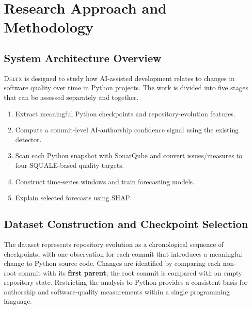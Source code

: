 \documentclass[12pt,a4paper,oneside]{report}
\newcommand{\systemname}{\textsc{Deltx}}
\begin{document}
\chapter{Research Approach and Methodology}
\label{ch:methodology}

\section{System Architecture Overview}
\systemname{} is designed to study how AI-assisted development relates to changes in software quality over time in Python projects. The work is divided into five stages that can be assessed separately and together.

\begin{enumerate}[leftmargin=*]
    \item Extract meaningful Python checkpoints and repository-evolution features.
    \item Compute a commit-level AI-authorship confidence signal using the existing detector.
    \item Scan each Python snapshot with SonarQube and convert issues/measures to four SQUALE-based quality targets.
    \item Construct time-series windows and train forecasting models.
    \item Explain selected forecasts using SHAP.
\end{enumerate}

\section{Dataset Construction and Checkpoint Selection}
The dataset represents repository evolution as a chronological sequence of checkpoints, with one observation for each commit that introduces a meaningful change to Python source code. Changes are identified by comparing each non-root commit with its \textbf{first parent}; the root commit is compared with an empty repository state. Restricting the analysis to Python provides a consistent basis for authorship and software-quality measurements within a single programming language.
\end{document}
